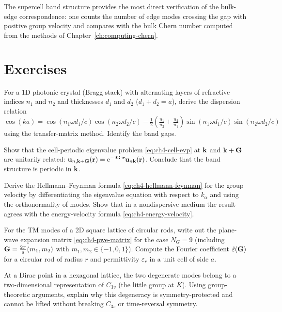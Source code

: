 The supercell band structure provides the most direct verification of
the bulk-edge correspondence: one counts the number of edge modes
crossing the gap with positive group velocity and compares with the
bulk Chern number computed from the methods of
Chapter~\ref{ch:computing-chern}.

\section*{Exercises}

\begin{exercise}
  For a 1D photonic crystal (Bragg stack) with alternating layers of
  refractive indices $n_1$ and $n_2$ and thicknesses $d_1$ and $d_2$
  ($d_1+d_2=a$), derive the dispersion relation
  $\cos(ka)=\cos(n_1\omega d_1/c)\cos(n_2\omega d_2/c)
  -\frac{1}{2}(\frac{n_1}{n_2}+\frac{n_2}{n_1})
  \sin(n_1\omega d_1/c)\sin(n_2\omega d_2/c)$
  using the transfer-matrix method.  Identify the band gaps.
\end{exercise}

\begin{exercise}
  Show that the cell-periodic eigenvalue problem \eqref{eq:ch4-cell-evp}
  at $\mathbf{k}$ and $\mathbf{k}+\mathbf{G}$ are unitarily related:
  $\mathbf{u}_{n,\mathbf{k}+\mathbf{G}}(\mathbf{r})
  =\mathrm{e}^{-\mathrm{i}\mathbf{G}\cdot\mathbf{r}}\mathbf{u}_{n\mathbf{k}}(\mathbf{r})$.
  Conclude that the band structure is periodic in $\mathbf{k}$.
\end{exercise}

\begin{exercise}
  Derive the Hellmann--Feynman formula \eqref{eq:ch4-hellmann-feynman}
  for the group velocity by differentiating the eigenvalue equation
  with respect to $k_\alpha$ and using the orthonormality of modes.
  Show that in a nondispersive medium the result agrees with the
  energy-velocity formula \eqref{eq:ch4-energy-velocity}.
\end{exercise}

\begin{exercise}
  For the TM modes of a 2D square lattice of circular rods, write out
  the plane-wave expansion matrix \eqref{eq:ch4-pwe-matrix} for the
  case $N_G=9$ (including $\mathbf{G}=\frac{2\pi}{a}(m_1,m_2)$ with
  $m_1,m_2\in\{-1,0,1\}$).  Compute the Fourier coefficient
  $\hat\varepsilon(\mathbf{G})$ for a circular rod of radius $r$ and
  permittivity $\varepsilon_r$ in a unit cell of side $a$.
\end{exercise}

\begin{exercise}
  At a Dirac point in a hexagonal lattice, the two degenerate modes
  belong to a two-dimensional representation of $C_{3v}$ (the little
  group at $K$).  Using group-theoretic arguments, explain why this
  degeneracy is symmetry-protected and cannot be lifted without
  breaking $C_{3v}$ or time-reversal symmetry.
\end{exercise}
